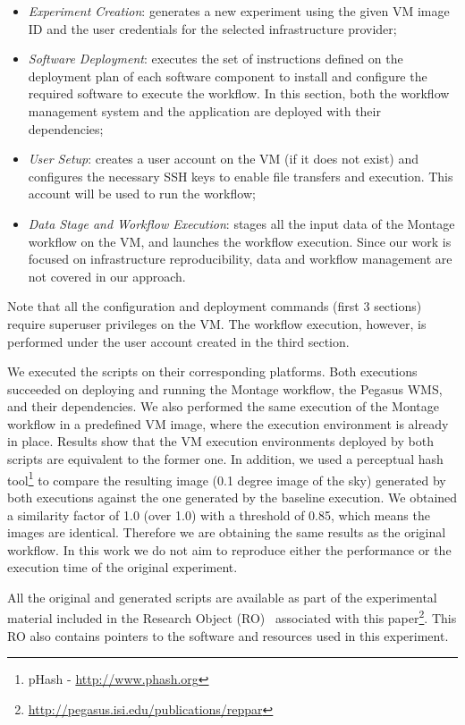 \begin{itemize}

	\item \emph{Experiment Creation}: generates a new experiment using the given VM image ID and the user credentials for the selected infrastructure provider;
    	    
	\item \emph{Software Deployment}: executes the set of instructions defined on the deployment plan of each software component to install and configure the required software to execute the workflow. In this section, both the workflow management system and the application are deployed with their dependencies;

	\item \emph{User Setup}: creates a user account on the VM (if it does not exist) and configures the necessary SSH keys to enable file transfers and execution. This account will be used to run the workflow;
	   
	\item \emph{Data Stage and Workflow Execution}: stages all the input data of the Montage workflow on the VM, and launches the workflow execution. Since our work is focused on infrastructure reproducibility, data and workflow management are not covered in our approach.

\end{itemize}

\noindent Note that all the configuration and deployment commands (first 3 sections) require superuser privileges on the VM. The workflow execution, however, is performed under the user account created in the third section.



We executed the scripts on their corresponding platforms. Both executions succeeded on deploying and running the Montage workflow, the Pegasus WMS, and their dependencies. We also performed the same execution of the Montage workflow in a predefined VM image, where the execution environment is already in place. Results show that the VM execution environments deployed by both scripts are equivalent to the former one. In addition, we used a perceptual hash tool\footnote{pHash - \url{http://www.phash.org}} to compare the resulting image (0.1 degree image of the sky) generated by both executions against the one generated by the baseline execution. We obtained a similarity factor of 1.0 (over 1.0) with a threshold of 0.85, which means the images are identical. Therefore we are obtaining the same results as the original workflow. In this work we do not aim to reproduce either the performance or the execution time of the original experiment.


All the original and generated scripts are available as part of the experimental material included in the Research Object (RO)~\cite{researchObjects} associated with this paper\footnote{\url{http://pegasus.isi.edu/publications/reppar}}. This RO also contains pointers to the software and resources used in this experiment.